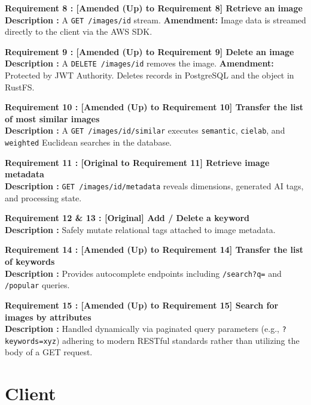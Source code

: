 \documentclass[12pt, a4paper]{article}
\begin{document}
\noindent\textbf{Requirement 8 : [Amended (Up) to Requirement 8] Retrieve an image}\\
\textbf{Description :} A \texttt{GET /images/id} stream. \textbf{Amendment:} Image data is streamed directly to the client via the AWS SDK.
\vspace{1em}

\noindent\textbf{Requirement 9 : [Amended (Up) to Requirement 9] Delete an image}\\
\textbf{Description :} A \texttt{DELETE /images/id} removes the image. \textbf{Amendment:} Protected by JWT Authority. Deletes records in PostgreSQL and the object in RustFS.
\vspace{1em}

\noindent\textbf{Requirement 10 : [Amended (Up) to Requirement 10] Transfer the list of most similar images}\\
\textbf{Description :} A \texttt{GET /images/id/similar} executes \texttt{semantic}, \texttt{cielab}, and \texttt{weighted} Euclidean searches in the database.
\vspace{1em}

\noindent\textbf{Requirement 11 : [Original to Requirement 11] Retrieve image metadata}\\
\textbf{Description :} \texttt{GET /images/id/metadata} reveals dimensions, generated AI tags, and processing state.
\vspace{1em}

\noindent\textbf{Requirement 12 \& 13 : [Original] Add / Delete a keyword}\\
\textbf{Description :} Safely mutate relational tags attached to image metadata.
\vspace{1em}

\noindent\textbf{Requirement 14 : [Amended (Up) to Requirement 14] Transfer the list of keywords}\\
\textbf{Description :} Provides autocomplete endpoints including \texttt{/search?q=} and \texttt{/popular} queries.
\vspace{1em}

\noindent\textbf{Requirement 15 : [Amended (Up) to Requirement 15] Search for images by attributes}\\
\textbf{Description :} Handled dynamically via paginated query parameters (e.g., \texttt{?keywords=xyz}) adhering to modern RESTful standards rather than utilizing the body of a GET request.

\clearpage

\section{Client}
\end{document}
